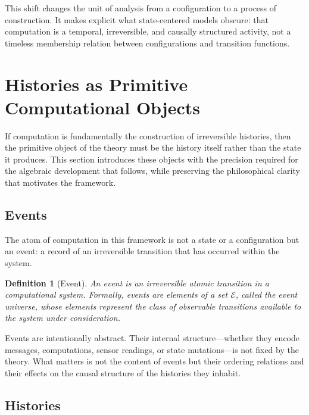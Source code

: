 \documentclass[12pt]{article}
\newtheorem{definition}{Definition}
\begin{document}
This shift changes the unit of analysis from a configuration to a process of construction. It
makes explicit what state-centered models obscure: that computation is a temporal, irreversible,
and causally structured activity, not a timeless membership relation between configurations and
transition functions.

\section{Histories as Primitive Computational Objects}
\label{sec:histories}

If computation is fundamentally the construction of irreversible histories, then the primitive
object of the theory must be the history itself rather than the state it produces. This section
introduces these objects with the precision required for the algebraic development that follows,
while preserving the philosophical clarity that motivates the framework.

\subsection{Events}

The atom of computation in this framework is not a state or a configuration but an event: a
record of an irreversible transition that has occurred within the system.

\begin{definition}[Event]
An \emph{event} is an irreversible atomic transition in a computational system. Formally,
events are elements of a set $\mathcal{E}$, called the \emph{event universe}, whose elements
represent the class of observable transitions available to the system under consideration.
\end{definition}

Events are intentionally abstract. Their internal structure---whether they encode messages,
computations, sensor readings, or state mutations---is not fixed by the theory. What matters
is not the content of events but their ordering relations and their effects on the causal
structure of the histories they inhabit.

\subsection{Histories}
\end{document}
